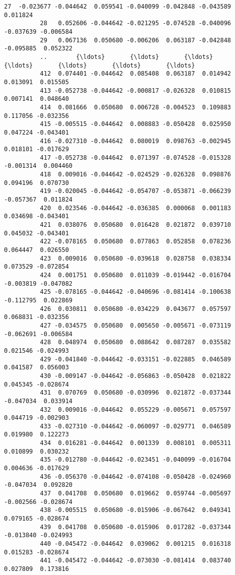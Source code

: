 \documentclass[11pt]{article}
\begin{document}
\begin{Verbatim}[commandchars=\\\{\}]
          27  -0.023677 -0.044642  0.059541 -0.040099 -0.042848 -0.043589  0.011824   
          28   0.052606 -0.044642 -0.021295 -0.074528 -0.040096 -0.037639 -0.006584   
          29   0.067136  0.050680 -0.006206  0.063187 -0.042848 -0.095885  0.052322   
          ..        {\ldots}       {\ldots}       {\ldots}       {\ldots}       {\ldots}       {\ldots}       {\ldots}   
          412  0.074401 -0.044642  0.085408  0.063187  0.014942  0.013091  0.015505   
          413 -0.052738 -0.044642 -0.000817 -0.026328  0.010815  0.007141  0.048640   
          414  0.081666  0.050680  0.006728 -0.004523  0.109883  0.117056 -0.032356   
          415 -0.005515 -0.044642  0.008883 -0.050428  0.025950  0.047224 -0.043401   
          416 -0.027310 -0.044642  0.080019  0.098763 -0.002945  0.018101 -0.017629   
          417 -0.052738 -0.044642  0.071397 -0.074528 -0.015328 -0.001314  0.004460   
          418  0.009016 -0.044642 -0.024529 -0.026328  0.098876  0.094196  0.070730   
          419 -0.020045 -0.044642 -0.054707 -0.053871 -0.066239 -0.057367  0.011824   
          420  0.023546 -0.044642 -0.036385  0.000068  0.001183  0.034698 -0.043401   
          421  0.038076  0.050680  0.016428  0.021872  0.039710  0.045032 -0.043401   
          422 -0.078165  0.050680  0.077863  0.052858  0.078236  0.064447  0.026550   
          423  0.009016  0.050680 -0.039618  0.028758  0.038334  0.073529 -0.072854   
          424  0.001751  0.050680  0.011039 -0.019442 -0.016704 -0.003819 -0.047082   
          425 -0.078165 -0.044642 -0.040696 -0.081414 -0.100638 -0.112795  0.022869   
          426  0.030811  0.050680 -0.034229  0.043677  0.057597  0.068831 -0.032356   
          427 -0.034575  0.050680  0.005650 -0.005671 -0.073119 -0.062691 -0.006584   
          428  0.048974  0.050680  0.088642  0.087287  0.035582  0.021546 -0.024993   
          429 -0.041840 -0.044642 -0.033151 -0.022885  0.046589  0.041587  0.056003   
          430 -0.009147 -0.044642 -0.056863 -0.050428  0.021822  0.045345 -0.028674   
          431  0.070769  0.050680 -0.030996  0.021872 -0.037344 -0.047034  0.033914   
          432  0.009016 -0.044642  0.055229 -0.005671  0.057597  0.044719 -0.002903   
          433 -0.027310 -0.044642 -0.060097 -0.029771  0.046589  0.019980  0.122273   
          434  0.016281 -0.044642  0.001339  0.008101  0.005311  0.010899  0.030232   
          435 -0.012780 -0.044642 -0.023451 -0.040099 -0.016704  0.004636 -0.017629   
          436 -0.056370 -0.044642 -0.074108 -0.050428 -0.024960 -0.047034  0.092820   
          437  0.041708  0.050680  0.019662  0.059744 -0.005697 -0.002566 -0.028674   
          438 -0.005515  0.050680 -0.015906 -0.067642  0.049341  0.079165 -0.028674   
          439  0.041708  0.050680 -0.015906  0.017282 -0.037344 -0.013840 -0.024993   
          440 -0.045472 -0.044642  0.039062  0.001215  0.016318  0.015283 -0.028674   
          441 -0.045472 -0.044642 -0.073030 -0.081414  0.083740  0.027809  0.173816   
          

\end{Verbatim}
\end{document}
